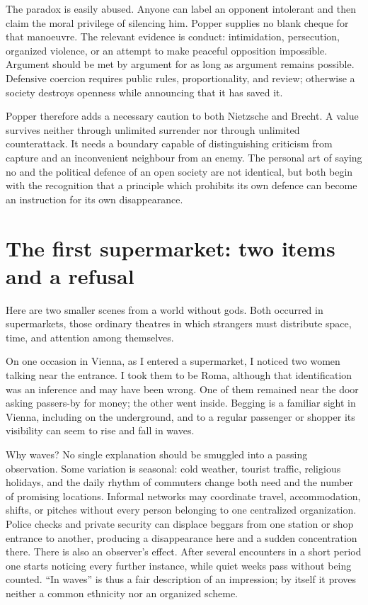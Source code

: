 ﻿\documentclass[12pt,a4paper]{book}
\begin{document}
The paradox is easily abused.  Anyone can label an opponent intolerant and then
claim the moral privilege of silencing him.  Popper supplies no blank cheque
for that manoeuvre.  The relevant evidence is conduct: intimidation,
persecution, organized violence, or an attempt to make peaceful opposition
impossible.  Argument should be met by argument for as long as argument remains
possible.  Defensive coercion requires public rules, proportionality, and
review; otherwise a society destroys openness while announcing that it has
saved it.

Popper therefore adds a necessary caution to both Nietzsche and Brecht.  A
value survives neither through unlimited surrender nor through unlimited
counterattack.  It needs a boundary capable of distinguishing criticism from
capture and an inconvenient neighbour from an enemy.  The personal art of
saying no and the political defence of an open society are not identical, but
both begin with the recognition that a principle which prohibits its own
defence can become an instruction for its own disappearance.

\section{The first supermarket: two items and a refusal}

Here are two smaller scenes from a world without gods.  Both occurred in
supermarkets, those ordinary theatres in which strangers must distribute
space, time, and attention among themselves.

On one occasion in Vienna, as I entered a supermarket, I noticed two women
talking near the entrance.  I took them to be Roma, although that identification
was an inference and may have been wrong.  One of them remained near the door
asking passers-by for money; the other went inside.  Begging is a familiar sight
in Vienna, including on the underground, and to a regular passenger or shopper
its visibility can seem to rise and fall in waves.

Why waves?  No single explanation should be smuggled into a passing
observation.  Some variation is seasonal: cold weather, tourist traffic,
religious holidays, and the daily rhythm of commuters change both need and the
number of promising locations.  Informal networks may coordinate travel,
accommodation, shifts, or pitches without every person belonging to one
centralized organization.  Police checks and private security can displace
beggars from one station or shop entrance to another, producing a disappearance
here and a sudden concentration there.  There is also an observer's effect.
After several encounters in a short period one starts noticing every further
instance, while quiet weeks pass without being counted.  ``In waves'' is thus
a fair description of an impression; by itself it proves neither a common
ethnicity nor an organized scheme.
\end{document}
